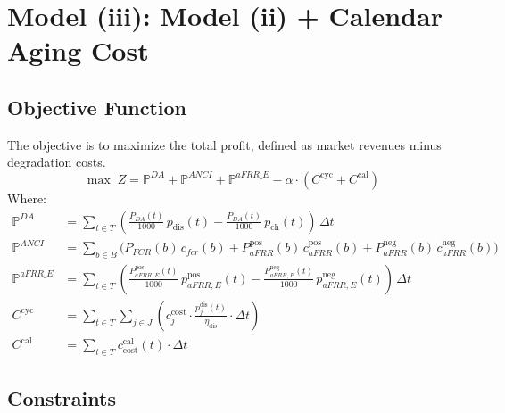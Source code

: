 \documentclass[11pt, a4paper]{article}
\begin{document}
\section{Model (iii): Model (ii) + Calendar Aging Cost}

\subsection{Objective Function}
The objective is to maximize the total profit, defined as market revenues minus degradation costs.
\begin{equation}
\max \; Z = \mathbb{P}^{DA} + \mathbb{P}^{ANCI} + \mathbb{P}^{aFRR\_E} - \alpha \cdot (C^{\mathrm{cyc}} + C^{\mathrm{cal}})
\end{equation}
Where:
\begin{align}
\mathbb{P}^{DA} &= \sum_{t\in T} \left( \frac{P_{DA}(t)}{1000}\, p_{\mathrm{dis}}(t) - \frac{P_{DA}(t)}{1000}\, p_{\mathrm{ch}}(t) \right)\, \Delta t \\
\mathbb{P}^{ANCI} &= \sum_{b\in B} \Big( P_{FCR}(b)\, c_{fcr}(b) + P^{\mathrm{pos}}_{aFRR}(b)\, c^{\mathrm{pos}}_{aFRR}(b) + P^{\mathrm{neg}}_{aFRR}(b)\, c^{\mathrm{neg}}_{aFRR}(b) \Big) \\
\mathbb{P}^{aFRR\_E} &= \sum_{t\in T} \left( \frac{P^{\mathrm{pos}}_{aFRR, E}(t)}{1000}\, p^{\mathrm{pos}}_{aFRR, E}(t) - \frac{P^{\mathrm{neg}}_{aFRR, E}(t)}{1000}\, p^{\mathrm{neg}}_{aFRR, E}(t) \right)\, \Delta t \\
C^{\mathrm{cyc}} &= \sum_{t \in T} \sum_{j \in J} \left( c^{\mathrm{cost}}_{j} \cdot \frac{p^{\mathrm{dis}}_{j}(t)}{\eta_{\mathrm{dis}}} \cdot \Delta t \right) \\
C^{\mathrm{cal}} &= \sum_{t \in T} c^{\mathrm{cal}}_{\mathrm{cost}}(t) \cdot \Delta t
\end{align}

\subsection{Constraints}
\end{document}
